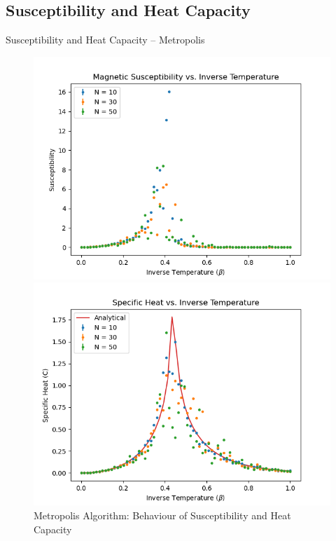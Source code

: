 \documentclass{beamer}
\begin{document}
\subsection{Susceptibility and Heat Capacity}
\begin{frame}{Susceptibility and Heat Capacity – Metropolis}
    \begin{figure}[htbp]
	\begin{center}
		\begin{minipage}[t]{0.49\linewidth}
			\centering
			\includegraphics[width=\linewidth]{metro_chi-beta.png}
		\end{minipage}
		\begin{minipage}[t]{0.49\linewidth}
			\centering
			\includegraphics[width=\linewidth]{metro_c-beta.png}
		\end{minipage}
        \caption{Metropolis Algorithm: Behaviour of Susceptibility and Heat Capacity}
	\end{center}
    \end{figure}
\end{frame}
\end{document}
